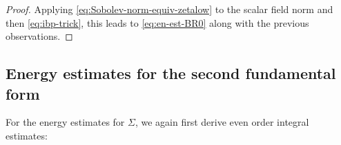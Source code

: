 \documentclass[11pt,leqno,textwidth=10cm]{amsart}
\numberwithin{equation}{section}
\theoremstyle{definition}
\theoremstyle{plain}
\newcommand{\1}{\mathbbm{1}}
\newcommand{\E}{\mathcal{E}}
\renewcommand{\epsilon}{\varepsilon}
\newcommand{\change}[1]{\color{black}#1\color{black}}
\begin{document}
\begin{proof}
Applying \eqref{eq:Sobolev-norm-equiv-zetalow} to the scalar field norm and then \eqref{eq:ibp-trick}, this leads to \eqref{eq:en-est-BR0} along with the previous observations.
\end{proof}


\subsection{Energy estimates for the second fundamental form}\label{subsec:en-Sigma}

For the energy estimates for $\Sigma$, we again first derive \change{even order }integral estimates:
\end{document}

